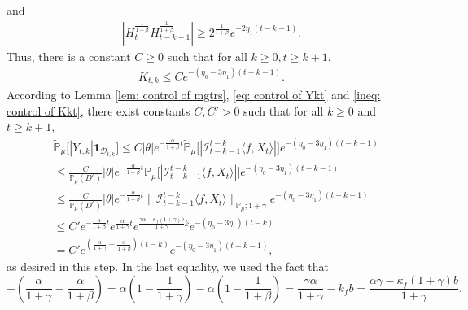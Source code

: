 \documentclass[12pt,a4paper]{amsart}
\theoremstyle{plain}
\theoremstyle{definition}
\numberwithin{equation}{section}
\begin{document}
    and
\begin{align*}
    |H_t^{\frac{1}{1+\beta}}H_{t-k-1}^{\frac{1}{1+\beta}}|
    \geq 2^{\frac{1}{1+\beta}} e^{-2\eta_1(t-k-1)}.
\end{align*}
    Thus, there is a constant $C\geq 0$ such that for all $k \geq 0, t\geq k+1$, 
\begin{equation}\begin{split}
\label{ineq: control of Kkt}
     K_{t,k}
     \leq C e^{-(\eta_0 - 3\eta_1)(t-k-1)}.
\end{split}\end{equation}
    According to Lemma \ref{lem: control of mgtrs}, \eqref{eq: control of Ykt} and \eqref{ineq: control of Kkt}, there exist constants $C,C'>0$ such that for all $k\geq 0$ and $t\geq k+1$,
\begin{equation}\begin{split}
\label{eq: Y in D}
    &\mathbb{\tilde{P}}_{\mu}\big[|Y_{t,k}|\mathbf{1}_{\mathcal{D}_{t,k}}\big]
    \leq C|\theta|e^{-\frac{\alpha}{1+\beta}t}\mathbb{\tilde{P}}_{\mu}\big[|\mathcal{I}_{t-k-1}^{t-k}\langle f,X_t\rangle|\big]e^{-(\eta_0 - 3\eta_1)(t-k-1)}
    \\&\leq \frac{C}{\mathbb{P}_{\mu}(D^c)}|\theta|e^{-\frac{\alpha}{1+\beta}t}\mathbb{P}_{\mu}\big[|\mathcal{I}_{t-k-1}^{t-k}\langle f,X_t\rangle|\big]e^{-(\eta_0 - 3\eta_1)(t-k-1)}
    \\&\leq \frac{C}{\mathbb{P}_{\mu}(D^c)}|\theta|e^{-\frac{\alpha}{1+\beta}t}\|\mathcal{I}_{t-k-1}^{t-k}\langle f,X_t\rangle\|_{\mathbb P_\mu; 1+\gamma} e^{-(\eta_0 - 3\eta_1)(t-k - 1)}
    \\&\leq C' e^{-\frac{\alpha}{1+\beta}t}e^{\frac{\alpha}{1+\gamma}t}e^{\frac{\gamma \alpha-\kappa_f(1+\gamma)b}{1+\gamma}k}e^{-(\eta_0 - 3\eta_1)(t-k)}\\&= C' e^{(\frac{\alpha}{1+\gamma}-\frac{\alpha}{1+\beta})(t-k)}e^{-(\eta_0 - 3\eta_1)(t-k-1)},
\end{split}\end{equation}
    as desired in this step.
    In the last equality, we used the fact that
\[
    -(\frac{\alpha}{1+\gamma}-\frac{\alpha}{1+\beta})
    = \alpha(1-\frac{1}{1+\gamma}) - \alpha(1-\frac{1}{1+\beta})
    = \frac{\gamma \alpha}{1+\gamma} - k_f b
    =\frac{\alpha \gamma-\kappa_f(1+\gamma)b}{1+\gamma}.
\]
\end{document}
